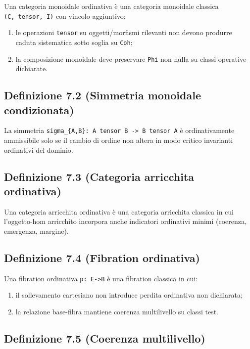 Una categoria monoidale ordinativa è una categoria monoidale classica \texttt{(C,\ tensor,\ I)} con vincolo aggiuntivo:

\begin{enumerate}
\def\labelenumi{\arabic{enumi}.}
\tightlist
\item
  le operazioni \texttt{tensor} su oggetti/morfismi rilevanti non devono produrre caduta sistematica sotto soglia su \texttt{Coh};
\item
  la composizione monoidale deve preservare \texttt{Phi} non nulla su classi operative dichiarate.
\end{enumerate}

\subsection{Definizione 7.2 (Simmetria monoidale condizionata)}

La simmetria \texttt{sigma\_\{A,B\}:\ A\ tensor\ B\ -\textgreater{}\ B\ tensor\ A} è ordinativamente ammissibile solo se il cambio di ordine non altera in modo critico invarianti ordinativi del dominio.

\subsection{Definizione 7.3 (Categoria arricchita ordinativa)}

Una categoria arricchita ordinativa è una categoria arricchita classica in cui l'oggetto-hom arricchito incorpora anche indicatori ordinativi minimi (coerenza, emergenza, margine).

\subsection{Definizione 7.4 (Fibration ordinativa)}

Una fibration ordinativa \texttt{p:\ E-\textgreater{}B} è una fibration classica in cui:

\begin{enumerate}
\def\labelenumi{\arabic{enumi}.}
\tightlist
\item
  il sollevamento cartesiano non introduce perdita ordinativa non dichiarata;
\item
  la relazione base-fibra mantiene coerenza multilivello su classi test.
\end{enumerate}

\subsection{Definizione 7.5 (Coerenza multilivello)}

